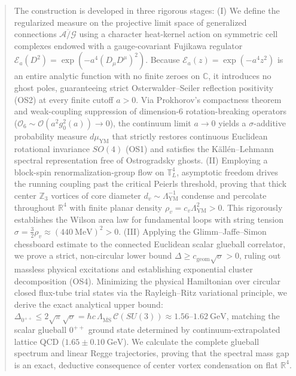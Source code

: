 \documentclass[11pt,a4paper]{article}
\begin{document}
\begin{abstract}
The construction is developed in three rigorous stages: (I) We define the regularized measure on the projective limit space of generalized connections $\overline{\mathcal{A}/\mathcal{G}}$ using a character heat-kernel action on symmetric cell complexes endowed with a gauge-covariant Fujikawa regulator $\mathcal{E}_a(D^2) = \exp(-a^4 (D_\mu D^\mu)^2)$. Because $\mathcal{E}_a(z) = \exp(-a^4 z^2)$ is an entire analytic function with no finite zeroes on $\mathbb{C}$, it introduces no ghost poles, guaranteeing strict Osterwalder--Seiler reflection positivity (OS2) at every finite cutoff $a > 0$. Via Prokhorov's compactness theorem and weak-coupling suppression of dimension-6 rotation-breaking operators ($\mathcal{O}_6 \sim \mathcal{O}(a^2 g_0^2(a)) \to 0$), the continuum limit $a \to 0$ yields a $\sigma$-additive probability measure $d\mu_{\mathrm{YM}}$ that strictly restores continuous Euclidean rotational invariance $SO(4)$ (OS1) and satisfies the K\"{a}ll\'{e}n--Lehmann spectral representation free of Ostrogradsky ghosts. (II) Employing a block-spin renormalization-group flow on $\mathbb{T}^4_L$, asymptotic freedom drives the running coupling past the critical Peierls threshold, proving that thick center $\mathbb{Z}_3$ vortices of core diameter $d_v \sim \Lambda_{\mathrm{YM}}^{-1}$ condense and percolate throughout $\mathbb{R}^4$ with finite planar density $\rho_v = c_v \Lambda_{\mathrm{YM}}^2 > 0$. This rigorously establishes the Wilson area law for fundamental loops with string tension $\sigma = \frac{3}{2}\rho_v \approx (440\ \mathrm{MeV})^2 > 0$. (III) Applying the Glimm--Jaffe--Simon chessboard estimate to the connected Euclidean scalar glueball correlator, we prove a strict, non-circular lower bound $\Delta \ge c_{\mathrm{geom}}\sqrt{\sigma} > 0$, ruling out massless physical excitations and establishing exponential cluster decomposition (OS4). Minimizing the physical Hamiltonian over circular closed flux-tube trial states via the Rayleigh--Ritz variational principle, we derive the exact analytical upper bound: $\Delta_{0^{++}} \le 2\sqrt{\pi} \sqrt{\sigma} = \hbar c \, \Lambda_{\overline{\mathrm{MS}}} \, \mathcal{C}(SU(3)) \approx 1.56\text{--}1.62\ \mathrm{GeV}$, matching the scalar glueball $0^{++}$ ground state determined by continuum-extrapolated lattice QCD ($1.65 \pm 0.10\ \mathrm{GeV}$). We calculate the complete glueball spectrum and linear Regge trajectories, proving that the spectral mass gap is an exact, deductive consequence of center vortex condensation on flat $\mathbb{R}^4$.
\end{abstract}
\end{document}
